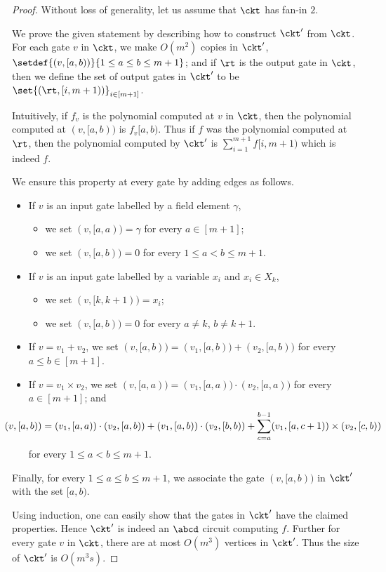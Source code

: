 \orderCkt*

\begin{proof}
	Without loss of generality, let us assume that $\ckt$ has fan-in $2$.
	
	We prove the given statement by describing how to construct $\ckt'$ from $\ckt$. 	
	For each gate $v$ in $\ckt$, we make $O(m^2)$ copies in $\ckt'$, $\setdef{(v, [a,b))}{1 \leq a \leq b \leq m+1}$; and if $\rt$ is the output gate in $\ckt$, then we define the set of output gates in $\ckt'$ to be $\set{(\rt, [i,m+1))}_{i \in [m+1]}$. 
	
	Intuitively, if $f_v$ is the polynomial computed at $v$ in $\ckt$, then the polynomial computed at $(v, [a,b))$ is $f_v[a,b)$. 
	Thus if $f$ was the polynomial computed at $\rt$, then the polynomial computed by $\ckt'$ is $\sum_{i=1}^{m+1} f[i,m+1)$ which is indeed $f$.
	
	We ensure this property at every gate by adding edges as follows. 	
	\begin{itemize}
		\item If $v$ is an input gate labelled by a field element $\gamma$, 
		\begin{itemize}
			\item we set $(v, [a,a)) = \gamma$ for every $a \in [m+1]$;
			\item we set $(v, [a,b)) = 0$ for every $1 \leq a < b \leq m+1$.
		\end{itemize}
		\item If $v$ is an input gate labelled by a variable $x_i$ and $x_i \in X_k$, 
		\begin{itemize}
			\item we set $(v, [k, k+1)) = x_i$;
			\item we set $(v, [a,b)) = 0$ for every $a \neq k$, $b \neq k+1$.
		\end{itemize} 
		\item If $v = v_1 + v_2$, \qquad we set $(v, [a,b)) = (v_1, [a,b)) + (v_2, [a,b))$ for every $a \leq b \in [m+1]$.
		\item If $v = v_1 \times v_2$, \qquad we set $(v, [a,a)) = (v_1, [a,a)) \cdot (v_2, [a,a))$ for every $a \in [m+1]$; \quad and 
		\[
			\hspace{-2.5em}
			(v, [a,b)) = (v_1, [a,a)) \cdot (v_2, [a,b)) + (v_1, [a,b)) \cdot (v_2, [b,b)) + \sum_{c=a}^{b-1} (v_1, [a, c+1)) \times (v_2, [c, b))
		\]
		for every $1 \leq a < b \leq m+1$.
	\end{itemize}
	\noindent Finally, for every $1 \leq a \leq b \leq m+1$, we associate the gate $(v, [a,b))$ in $\ckt'$ with the set $[a,b)$. 
	
	Using induction, one can easily show that the gates in $\ckt'$ have the claimed properties. Hence $\ckt'$ is indeed an $\abcd$ circuit computing $f$. 
	Further for every gate $v$ in $\ckt$, there are at most $O(m^3)$ vertices in $\ckt'$. Thus the size of $\ckt'$ is $O(m^3 s)$.
\end{proof}


